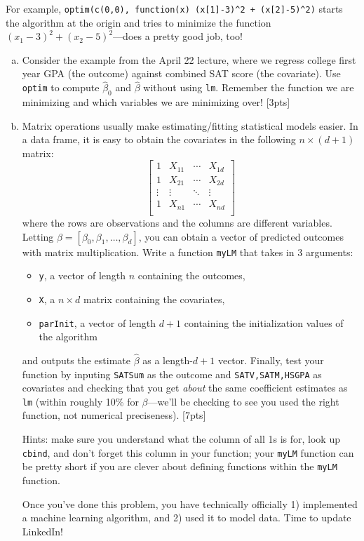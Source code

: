 \documentclass[12pt]{article}
\begin{document}
For example, \verb|optim(c(0,0), function(x) (x[1]-3)^2 + (x[2]-5)^2)| starts the algorithm at the origin and tries to minimize the function $(x_1 - 3)^2 + (x_2 - 5)^2$---does a pretty good job, too!

\begin{enumerate}[(a)]
	\item Consider the example from the April 22 lecture, where we regress college first year GPA (the outcome) against combined SAT score (the covariate). Use \verb|optim| to compute $\hat{\beta}_0$ and $\hat{\beta}$ without using \verb|lm|. Remember the function we are minimizing and which variables we are minimizing over! [3pts]
	\item Matrix operations usually make estimating/fitting statistical models easier. In a data frame, it is easy to obtain the covariates in the following $n \times (d+1)$ matrix:
	\[
	\begin{bmatrix}
	1 & X_{11} & \cdots & X_{1d} \\
	1 & X_{21} & \cdots & X_{2d} \\
	\vdots & \vdots & \ddots & \vdots \\
	1 & X_{n1} & \cdots & X_{nd} \\
	\end{bmatrix}
	\]
	where the rows are observations and the columns are different variables. Letting $\beta = [\beta_0, \beta_1, \ldots, \beta_d]$, you can obtain a vector of predicted outcomes with matrix multiplication. Write a function \verb|myLM| that takes in 3 arguments:
	\begin{itemize}
		\item \verb|y|, a vector of length $n$ containing the outcomes,
		\item \verb|X|, a $n \times d$ matrix containing the covariates,
		\item \verb|parInit|, a vector of length $d+1$ containing the initialization values of the algorithm
	\end{itemize}
	and outputs the estimate $\hat{\beta}$ as a length-$d+1$ vector. Finally, test your function by inputing \verb|SATSum| as the outcome and \verb|SATV,SATM,HSGPA| as covariates and checking that you get \textit{about} the same coefficient estimates as \verb|lm| (within roughly 10\% for $\beta$---we'll be checking to see you used the right function, not numerical preciseness). [7pts]
	
	Hints: make sure you understand what the column of all 1s is for, look up \verb|cbind|, and don't forget this column in your function; your \verb|myLM| function can be pretty short if you are clever about defining functions within the \verb|myLM| function.
	
	Once you've done this problem, you have technically officially 1) implemented a machine learning algorithm, and 2) used it to model data. Time to update LinkedIn!
\end{enumerate}
\end{document}
